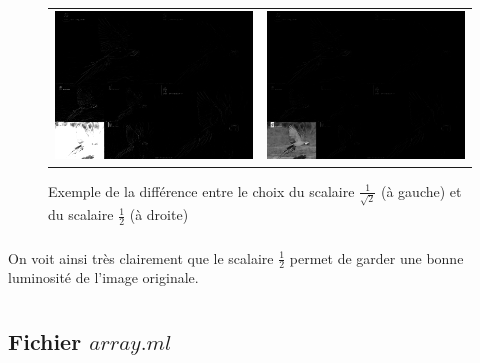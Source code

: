 \documentclass[a4paper,10pt]{report}
\theoremstyle{break}
\begin{document}
  \begin{figure}[!h]

    \begin{tabular}{cc}
    
      \includegraphics[width = 0.5 \linewidth]{ara_sqrt2.eps} &
      \includegraphics[width = 0.5 \linewidth]{ara_wt_V1.eps} \\	
      
    \end{tabular}
    
    \caption{Exemple de la diff\'{e}rence entre le choix du scalaire $\frac{1}{\sqrt{2}}$ (\`{a} gauche) 
	et du scalaire $\frac{1}{2}$ (\`{a} droite)}
    
  \end{figure}
  
  \paragraph{} On voit ainsi tr\`{e}s clairement que le scalaire $\frac{1}{2}$ permet de garder une bonne luminosit\'{e} de l'image originale.

\chapter{}

  \section*{Fichier $array.ml$}
  
\end{document}
